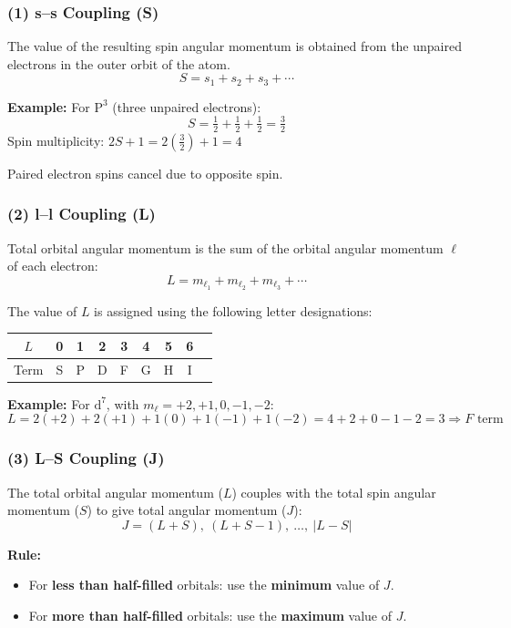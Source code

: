 \documentclass[12pt,a4paper]{article}
\begin{document}
\subsubsection{(1) s--s Coupling (S)}

The value of the resulting spin angular momentum is obtained from the unpaired electrons in the outer orbit of the atom.
\[
S = s_1 + s_2 + s_3 + \cdots
\]

\textbf{Example:} For $\mathrm{P}^3$ (three unpaired electrons):
\[
S = \tfrac{1}{2} + \tfrac{1}{2} + \tfrac{1}{2} = \tfrac{3}{2}
\]
Spin multiplicity: $2S+1 = 2\!\left(\tfrac{3}{2}\right)+1 = 4$

Paired electron spins cancel due to opposite spin.

\subsubsection{(2) l--l Coupling (L)}

Total orbital angular momentum is the sum of the orbital angular momentum $\ell$ of each electron:
\[
L = m_{\ell_1} + m_{\ell_2} + m_{\ell_3} + \cdots
\]

The value of $L$ is assigned using the following letter designations:

\begin{table}[H]
\centering
\begin{tabular}{ccccccccc}
\toprule
$L$ & 0 & 1 & 2 & 3 & 4 & 5 & 6 \\
\midrule
Term & S & P & D & F & G & H & I \\
\bottomrule
\end{tabular}
\end{table}

\textbf{Example:} For $\mathrm{d}^7$, with $m_\ell = +2,+1,0,-1,-2$:
\[
L = 2(+2) + 2(+1) + 1(0) + 1(-1) + 1(-2) = 4+2+0-1-2 = 3 \Rightarrow F\text{ term}
\]

\subsubsection{(3) L--S Coupling (J)}

The total orbital angular momentum ($L$) couples with the total spin angular momentum ($S$) to give total angular momentum ($J$):
\[
J = (L+S),\ (L+S-1),\ \ldots,\ |L-S|
\]

\textbf{Rule:}
\begin{itemize}
  \item For \textbf{less than half-filled} orbitals: use the \textbf{minimum} value of $J$.
  \item For \textbf{more than half-filled} orbitals: use the \textbf{maximum} value of $J$.
\end{itemize}
\end{document}

